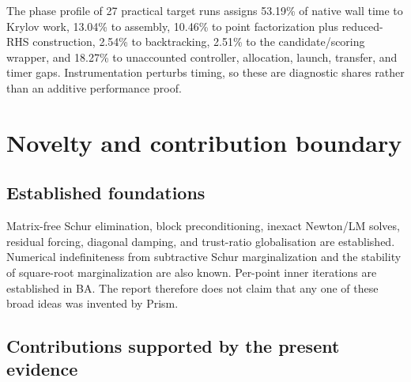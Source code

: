 \documentclass[10pt]{article}
\begin{document}
The phase profile of 27 practical target runs assigns 53.19\% of native wall time to Krylov work, 13.04\% to assembly, 10.46\% to point factorization plus reduced-RHS construction, 2.54\% to backtracking, 2.51\% to the candidate/scoring wrapper, and 18.27\% to unaccounted controller, allocation, launch, transfer, and timer gaps.  Instrumentation perturbs timing, so these are diagnostic shares rather than an additive performance proof.

\section{Novelty and contribution boundary}\label{sec:novelty}

\subsection{Established foundations}

Matrix-free Schur elimination, block preconditioning, inexact Newton/LM solves, residual forcing, diagonal damping, and trust-ratio globalisation are established\cite{Agarwal2010,EisenstatWalker1996,Conn2000}.  Numerical indefiniteness from subtractive Schur marginalization and the stability of square-root marginalization are also known\cite{Demmel2021}.  Per-point inner iterations are established in BA\cite{Jeong2012}.  The report therefore does not claim that any one of these broad ideas was invented by Prism.

\subsection{Contributions supported by the present evidence}
\end{document}
